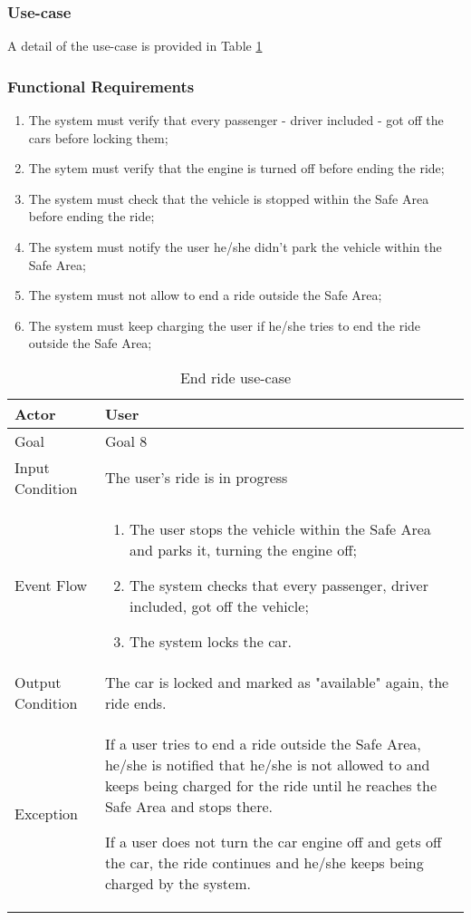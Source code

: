 \subsubsection{Use-case}
A detail of the use-case is provided in Table \ref{end_ride_uc}

\subsubsection{Functional Requirements}
\begin{enumerate}
\item The system must verify that every passenger - driver included - got off the cars before locking them;
\item The sytem must verify that the engine is turned off before ending the ride;
\item The system must check that the vehicle is stopped within the Safe Area before ending the ride;
\item The system must notify the user he/she didn't park the vehicle within the Safe Area;
\item The system must not allow to end a ride outside the Safe Area;
\item The system must keep charging the user if he/she tries to end the ride outside the Safe Area;
\end{enumerate}

\begin{table}[H]
\begin{center}
\begin{tabular}{p{} | p{}}
\hline
Actor & User\\
\hline
Goal & Goal 8\\
\hline
Input Condition & The user's ride is in progress\\
\hline
Event Flow & 
\begin{enumerate}
\item The user stops the vehicle within the Safe Area and parks it, turning the engine off;
\item The system checks that every passenger, driver included, got off the vehicle;
\item The system locks the car.
\end{enumerate} \\
\hline
Output Condition & The car is locked and marked as "available" again, the ride ends.\\
\hline
Exception & If a user tries to end a ride outside the Safe Area, he/she is notified that he/she is not allowed to and keeps being charged for the ride until he reaches the Safe Area and stops there.

If a user does not turn the car engine off and gets off the car, the ride continues and he/she keeps being charged by the system.\\
\hline
\end{tabular}
\end{center}
\caption{End ride use-case}
\label{end_ride_uc}
\end{table}
